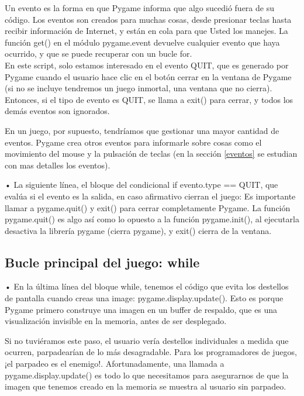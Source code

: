 Un evento es la forma en que {\ttfamily Pygame}  informa que algo sucedió fuera de su código. Los eventos son
creados para muchas cosas, desde presionar teclas hasta recibir información de Internet, y están
en cola para que  Usted  los manejes. La función {\ttfamily get()} en el módulo {\ttfamily pygame.event} devuelve
cualquier evento que haya ocurrido, y que se puede recuperar con un bucle {\ttfamily for}.\\ 

En este {\ttfamily script}, solo estamos interesado en el evento {\ttfamily QUIT}, que es generado por Pygame cuando el usuario hace clic en el botón cerrar en la ventana de Pygame (si no se incluye tendremos un juego inmortal, una ventana que no cierra). Entonces, si el tipo de evento es {\ttfamily QUIT}, se llama a {\ttfamily exit()} para cerrar, y todos los demás eventos son ignorados. 

En un juego, por supuesto, tendríamos que gestionar una mayor cantidad de eventos. Pygame crea otros eventos para informarle sobre cosas como el movimiento del mouse y la pulsación de teclas (en la sección \ref{eventos} se estudian con mas detalles los eventos).



•  La siguiente línea, el bloque del condicional {\ttfamily if evento.type == QUIT}, que evalúa si el evento es la salida,  en caso afirmativo cierran el juego: Es importante llamar a {\ttfamily pygame.quit()} y {\ttfamily exit()} para cerrar completamente {\ttfamily Pygame}. La función {\ttfamily pygame.quit()}  es algo así como lo opuesto a la función {\ttfamily pygame.init()}, al ejecutarla desactiva la librería  {\ttfamily  pygame} (cierra {\ttfamily pygame}), y  {\ttfamily exit()} cierra de la ventana.\\

\subsection*{Bucle principal del juego: {\ttfamily while}}

•  En la última línea del bloque {\ttfamily while}, tenemos el código que evita los destellos de pantalla cuando creas una image: {\ttfamily pygame.display.update()}.  Esto es porque Pygame primero construye una 
imagen en un buffer de respaldo, que es una visualización invisible en la memoria, antes de ser desplegado.

Si no tuviéramos este paso, el usuario vería destellos individuales a medida que ocurren, parpadearían
de lo más desagradable. Para los programadores de juegos, ¡el parpadeo es el enemigo!. Afortunadamente, una llamada a {\ttfamily pygame.display.update()} es todo lo que necesitamos para asegurarnos de que la imagen que tenemos creado en la memoria se muestra al usuario sin parpadeo.

